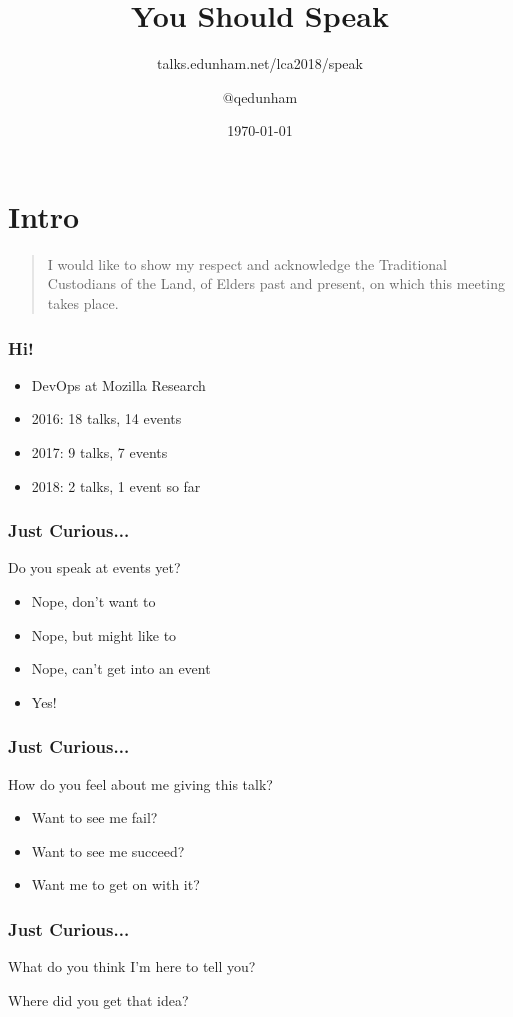 \documentclass{beamer}
\title{You Should Speak}
\subtitle{talks.edunham.net/lca2018/speak}
\author{$@$qedunham}
\institute{LinuxConf Australia}
\date{\today}
\begin{document}
\begin{frame}[fragile]
\titlepage
\end{frame}

\section{Intro}

\begin{frame}[fragile]
\begin{quote}
I would like to show my respect and acknowledge the Traditional
Custodians of the Land, of Elders past and present, on which this meeting
takes place.
\end{quote}
\end{frame}

\begin{frame}[fragile]
\frametitle{Hi!}
\begin{itemize}[<+(1)->]
\item DevOps at Mozilla Research
\item 2016: 18 talks, 14 events
\item 2017: 9 talks, 7 events
\item 2018: 2 talks, 1 event so far
\end{itemize}
\end{frame}

\begin{frame}[fragile]
\frametitle{Just Curious...}
Do you speak at events yet?
\begin{itemize}[<+(1)->]
\item Nope, don't want to
\item Nope, but might like to
\item Nope, can't get into an event
\item Yes!
\end{itemize}
\end{frame}

\begin{frame}[fragile]
\frametitle{Just Curious...}
How do you feel about me giving this talk?
\begin{itemize}[<+(1)->]
\item Want to see me fail?
\item Want to see me succeed?
\item Want me to get on with it?
\end{itemize}
\end{frame}

\begin{frame}[fragile]
\frametitle{Just Curious...}
What do you think I'm here to tell you?

Where did you get that idea?
\end{frame}
\end{document}
